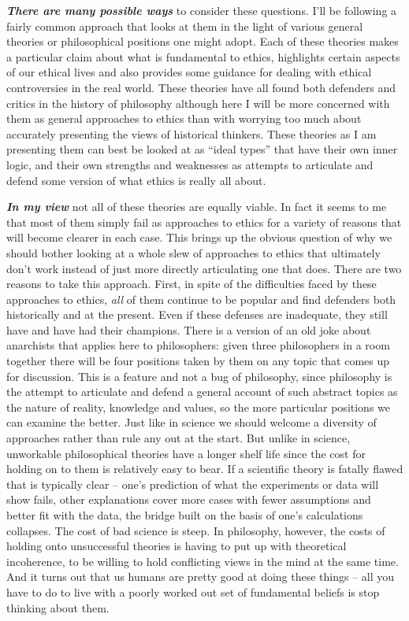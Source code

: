 \documentclass[12pt, openany]{book}
\begin{document}
\textbf{\emph{There are many possible ways}} to consider these questions. I'll be following a fairly common approach that looks at them in the light of various general theories or philosophical positions one might adopt. Each of these theories makes a particular claim about what is fundamental to ethics, highlights certain aspects of our ethical lives and also provides some guidance for dealing with ethical controversies in the real world. These theories have all found both defenders and critics in the history of philosophy although here I will be more concerned with them as general approaches to ethics than with worrying too much about accurately presenting the views of historical thinkers. These theories as I am presenting them can best be looked at as ``ideal types'' that have their own inner logic, and their own strengths and weaknesses as attempts to articulate and defend some version of what ethics is really all about.

\textbf{\emph{In my view}} not all of these theories are equally viable. In fact it seems to me that most of them simply fail as approaches to ethics for a variety of reasons that will become clearer in each case. This brings up the obvious question of why we should bother looking at a whole slew of approaches to ethics that ultimately don't work instead of just more directly articulating one that does. There are two reasons to take this approach. First, in spite of the difficulties faced by these approaches to ethics, \emph{all} of them continue to be popular and find defenders both historically and at the present. Even if these defenses are inadequate, they still have and have had their champions. There is a version of an old joke about anarchists that applies here to philosophers: given three philosophers in a room together there will be four positions taken by them on any topic that comes up for discussion. This is a feature and not a bug of philosophy, since philosophy is the attempt to articulate and defend a general account of such abstract topics as the nature of reality, knowledge and values, so the more particular positions we can examine the better. Just like in science we should welcome a diversity of approaches rather than rule any out at the start. But unlike in science, unworkable philosophical theories have a longer shelf life since the cost for holding on to them is relatively easy to bear. If a scientific theory is fatally flawed that is typically clear -- one's prediction of what the experiments or data will show fails, other explanations cover more cases with fewer assumptions and better fit with the data, the bridge built on the basis of one's calculations collapses. The cost of bad science is steep. In philosophy, however, the costs of holding onto unsuccessful theories is having to put up with theoretical incoherence, to be willing to hold conflicting views in the mind at the same time. And it turns out that us humans are pretty good at doing these things -- all you have to do to live with a poorly worked out set of fundamental beliefs is stop thinking about them.
\end{document}
